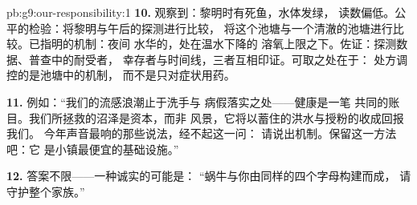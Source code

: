 \begin{solution}{pb:g9:our-responsibility:1}
\textbf{10.} 观察到：黎明时有死鱼，水体发绿，
读数偏低。公平的检验：将黎明与午后的探测进行比较，
将这个池塘与一个清澈的池塘进行比较。已指明的机制：夜间
水华的，处在温水下降的
溶氧上限之下。佐证：探测数据、普查中的耐受者，
幸存者与时间线，三者互相印证。可取之处在于：
处方调控的是池塘中的机制，
而不是只对症状用药。

\textbf{11.} 例如：“我们的流感浪潮止于洗手与
病假落实之处——健康是一笔
共同的账目。我们所拯救的沼泽是资本，而非
风景，它将以蓄住的洪水与授粉的收成回报我们。
今年声音最响的那些说法，经不起这一问：
请说出机制。保留这一方法吧：它
是小镇最便宜的基础设施。”

\textbf{12.} 答案不限——一种诚实的可能是：
“蜗牛与你由同样的四个字母构建而成，
请守护整个家族。”
\end{solution}
